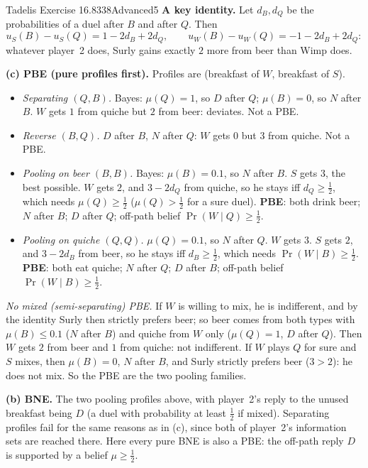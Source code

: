 \begin{exsol}{Tadelis Exercise 16.8}{338}{Advanced}{5}
\textbf{A key identity.} Let $d_B, d_Q$ be the probabilities of a duel after $B$ and after $Q$. Then
\[
  u_S(B) - u_S(Q) = 1 - 2d_B + 2d_Q, \qquad u_W(B) - u_W(Q) = -1 - 2d_B + 2d_Q :
\]
whatever player~2 does, Surly gains exactly $2$ more from beer than Wimp does.

\textbf{(c) PBE (pure profiles first).} Profiles are (breakfast of $W$, breakfast of $S$).
\begin{itemize}
  \item \emph{Separating $(Q, B)$.} Bayes: $\mu(Q) = 1$, so $D$ after $Q$; $\mu(B) = 0$, so $N$ after $B$. $W$ gets
  $1$ from quiche but $2$ from beer: deviates. Not a PBE.
  \item \emph{Reverse $(B, Q)$.} $D$ after $B$, $N$ after $Q$: $W$ gets $0$ but $3$ from quiche. Not a PBE.
  \item \emph{Pooling on beer $(B, B)$.} Bayes: $\mu(B) = 0.1$, so $N$ after $B$. $S$ gets $3$, the best possible.
  $W$ gets $2$, and $3 - 2d_Q$ from quiche, so he stays iff $d_Q \ge \frac12$, which needs
  $\mu(Q) \ge \frac12$ ($\mu(Q) > \frac12$ for a sure duel). \textbf{PBE}: both drink beer; $N$ after $B$; $D$
  after $Q$; off-path belief $\Pr(W \mid Q) \ge \frac12$.
  \item \emph{Pooling on quiche $(Q, Q)$.} $\mu(Q) = 0.1$, so $N$ after $Q$. $W$ gets $3$. $S$ gets $2$, and
  $3 - 2d_B$ from beer, so he stays iff $d_B \ge \frac12$, which needs $\Pr(W \mid B) \ge \frac12$. \textbf{PBE}:
  both eat quiche; $N$ after $Q$; $D$ after $B$; off-path belief $\Pr(W \mid B) \ge \frac12$.
\end{itemize}
\emph{No mixed (semi-separating) PBE.} If $W$ is willing to mix, he is indifferent, and by the identity Surly then
strictly prefers beer; so beer comes from both types with $\mu(B) \le 0.1$ ($N$ after $B$) and quiche from $W$
only ($\mu(Q) = 1$, $D$ after $Q$). Then $W$ gets $2$ from beer and $1$ from quiche: not indifferent.
If $W$ plays $Q$ for sure and $S$ mixes, then $\mu(B) = 0$, $N$ after $B$, and Surly strictly prefers beer
($3 > 2$): he does not mix. So the PBE are the two pooling families.

\textbf{(b) BNE.} The two pooling profiles above, with player~2's reply to the unused breakfast being $D$ (a
duel with probability at least $\frac12$ if mixed). Separating profiles fail for the same reasons as in (c), since
both of player~2's information sets are reached there. Here every pure BNE is also a PBE: the off-path reply
$D$ is supported by a belief $\mu \ge \frac12$.


\end{exsol}

